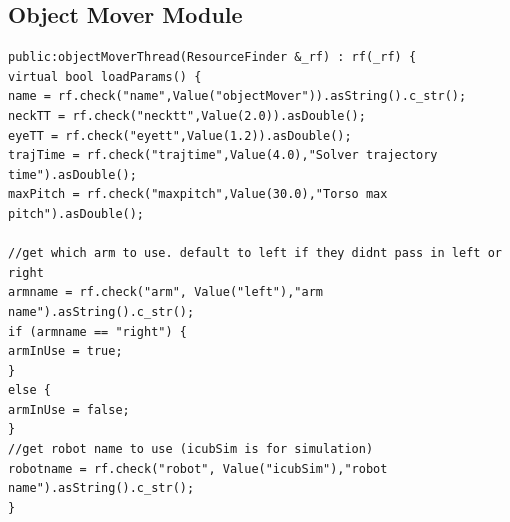\documentclass[a4paper, 11pt]{report}
\begin{document}
\subsection{Object Mover Module}
\begin{lstlisting}
public:objectMoverThread(ResourceFinder &_rf) : rf(_rf) {
virtual bool loadParams() {
name = rf.check("name",Value("objectMover")).asString().c_str();
neckTT = rf.check("necktt",Value(2.0)).asDouble();
eyeTT = rf.check("eyett",Value(1.2)).asDouble();
trajTime = rf.check("trajtime",Value(4.0),"Solver trajectory 
time").asDouble();
maxPitch = rf.check("maxpitch",Value(30.0),"Torso max pitch").asDouble();

//get which arm to use. default to left if they didnt pass in left or right
armname = rf.check("arm", Value("left"),"arm name").asString().c_str();
if (armname == "right") {
armInUse = true;
}
else {
armInUse = false;
}
//get robot name to use (icubSim is for simulation)
robotname = rf.check("robot", Value("icubSim"),"robot name").asString().c_str();
}
\end{lstlisting}

\appendix
\end{document}
